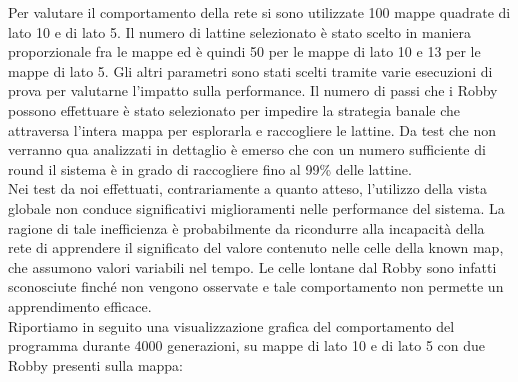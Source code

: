 Per valutare il comportamento della rete si sono utilizzate 100 mappe quadrate 
di lato 10 e di lato 5. Il numero di lattine selezionato è stato scelto in 
maniera proporzionale fra le mappe ed è quindi 50 per le mappe di lato 10 e 13 
per le mappe di lato 5. Gli altri parametri sono stati scelti tramite varie 
esecuzioni di prova per valutarne l'impatto sulla performance. Il numero di 
passi che i Robby possono effettuare è stato selezionato per impedire la 
strategia banale che attraversa l'intera mappa per esplorarla e raccogliere le 
lattine. Da test che non verranno qua analizzati in dettaglio è emerso che con 
un numero sufficiente di round il sistema è in grado di raccogliere fino al 
99\% delle lattine.
\\
Nei test da noi effettuati, contrariamente a quanto atteso, l'utilizzo della 
vista globale non conduce significativi miglioramenti nelle performance del 
sistema. La ragione di tale inefficienza è probabilmente da ricondurre alla 
incapacità della rete di apprendere il significato del valore contenuto 
nelle celle della known map, che assumono valori variabili nel tempo. Le celle 
lontane dal Robby sono infatti sconosciute finché non vengono osservate e tale 
comportamento non permette un apprendimento efficace.
\\
Riportiamo in seguito una visualizzazione grafica del comportamento del 
programma durante 4000 generazioni, su mappe di lato 10 e di lato 5 con due
Robby presenti sulla mappa:
